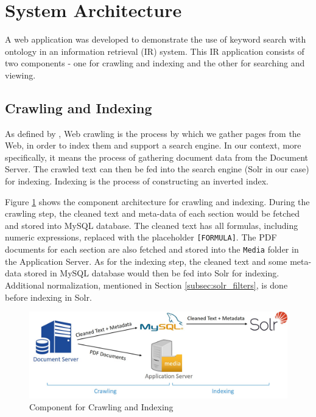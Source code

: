 \section{System Architecture}
A web application was developed to demonstrate the use of keyword search with ontology in an information retrieval (IR) system. This IR application consists of two components - one for crawling and indexing and the other for searching and viewing.

\subsection{Crawling and Indexing}
\label{subsec:crawl_and_index}
As defined by \citet{Manning2008}, Web crawling is the process by which we gather pages from the Web, in order to index them and support a search engine. In our context, more specifically, it means the process of gathering document data from the Document Server. The crawled text can then be fed into the search engine (Solr in our case) for indexing. Indexing is the process of constructing an inverted index.

Figure \ref{fig:comp_crawl_index} shows the component architecture for crawling and indexing. During the crawling step, the cleaned text and meta-data of each section would be fetched and stored into MySQL database. The cleaned text has all formulas, including numeric expressions, replaced with the placeholder \texttt{[FORMULA]}. The PDF documents for each section are also fetched and stored into the \texttt{Media} folder in the Application Server. As for the indexing step, the cleaned text and some meta-data stored in MySQL database would then be fed into Solr for indexing. Additional normalization, mentioned in Section \ref{subsec:solr_filters}, is done before indexing in Solr. 

\begin{figure}[!htbp]
  \includegraphics[width=.9\textwidth]{proposed_methodology_and_system_specifications/component_crawling_indexing.jpg}
  \caption{Component for Crawling and Indexing}
  \label{fig:comp_crawl_index}
\end{figure}


